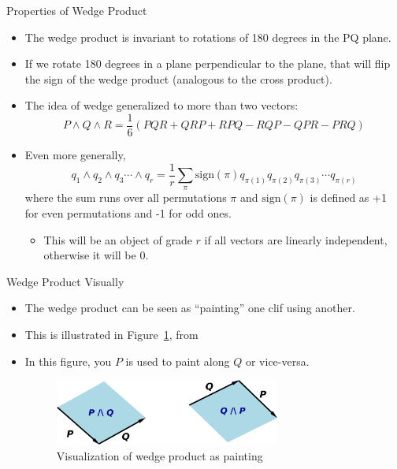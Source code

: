 \documentclass[aspectratio=169,xcolor=dvipsnames]{beamer}
\begin{document}



\begin{frame}{Properties of Wedge Product}


\begin{itemize}
      \item The wedge product is invariant to rotations of 180 degrees in the PQ
            plane.
      \item If we rotate 180 degrees in a plane perpendicular to the plane, that will
            flip the sign of the wedge product (analogous to the cross product).
      \item The idea of wedge generalized to more than two vectors:
            $$P\land Q\land R = \frac{1}{6}(PQR+QRP+RPQ-RQP-QPR-PRQ)$$
      \item Even more generally,
            $$q_1\land q_2\land q_3\cdots\land q_r = \frac{1}{r}\sum_\pi \text{sign}(\pi)
                  q_{\pi(1)}q_{\pi(2)}q_{\pi(3)}\cdots q_{\pi(r)}$$
            where the sum runs over all permutations $\pi$ and $\text{sign}(\pi)$ is defined as +1 for even permutations and -1 for odd ones.
            \begin{itemize}
                  \item This will be an object of grade $r$ if all vectors are linearly
                        independent, otherwise it will be 0.
            \end{itemize}

\end{itemize}
\end{frame}

\begin{frame}{Wedge Product Visually}


\begin{itemize}
      \item The wedge product can be seen as ``painting'' one clif using another.
      \item This is illustrated in Figure~\ref{Fig:Painting}, from~{\color{red}\cite{henle2025clifford}}
      \item In this figure, you $P$ is used to paint along $Q$ or vice-versa.
      \begin{figure}
            \includegraphics[width=0.7\textwidth]{Figs/WedgePainting.png}
            \caption{Visualization of wedge product as painting}\label{Fig:Painting}
      \end{figure}

\end{itemize}
\end{frame}
      
\end{document}

